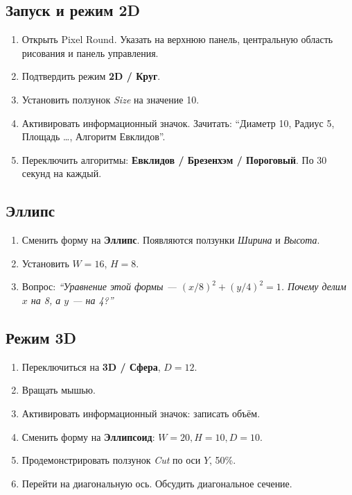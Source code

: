 \documentclass[12pt,a4paper]{scrartcl}
\newcommand{\acc}[1]{\textcolor{accent}{\textbf{#1}}}
\begin{document}
\subsection{Запуск и режим 2D}
\begin{enumerate}[leftmargin=1.5em,itemsep=0.15em,topsep=0.3em]
  \item Открыть Pixel Round. Указать на верхнюю панель, центральную область рисования и панель управления.
  \item Подтвердить режим \acc{2D / Круг}.
  \item Установить ползунок \emph{Size} на значение 10.
  \item Активировать информационный значок. Зачитать: ``Диаметр 10, Радиус 5, Площадь \dots, Алгоритм Евклидов''.
  \item Переключить алгоритмы: \acc{Евклидов / Брезенхэм / Пороговый}. По 30 секунд на каждый.
\end{enumerate}

\subsection{Эллипс}
\begin{enumerate}[leftmargin=1.5em,itemsep=0.15em,topsep=0.3em]
  \item Сменить форму на \acc{Эллипс}. Появляются ползунки \emph{Ширина} и \emph{Высота}.
  \item Установить $W = 16$, $H = 8$.
  \item Вопрос: \emph{``Уравнение этой формы --- $(x/8)^2 + (y/4)^2 = 1$. Почему делим $x$ на 8, а $y$ --- на 4?''}
\end{enumerate}

\subsection{Режим 3D}
\begin{enumerate}[leftmargin=1.5em,itemsep=0.15em,topsep=0.3em]
  \item Переключиться на \acc{3D / Сфера}, $D = 12$.
  \item Вращать мышью.
  \item Активировать информационный значок: записать объём.
  \item Сменить форму на \acc{Эллипсоид}: $W = 20, H = 10, D = 10$.
  \item Продемонстрировать ползунок \emph{Cut} по оси $Y$, 50\%.
  \item Перейти на диагональную ось. Обсудить диагональное сечение.
\end{enumerate}
\end{document}
